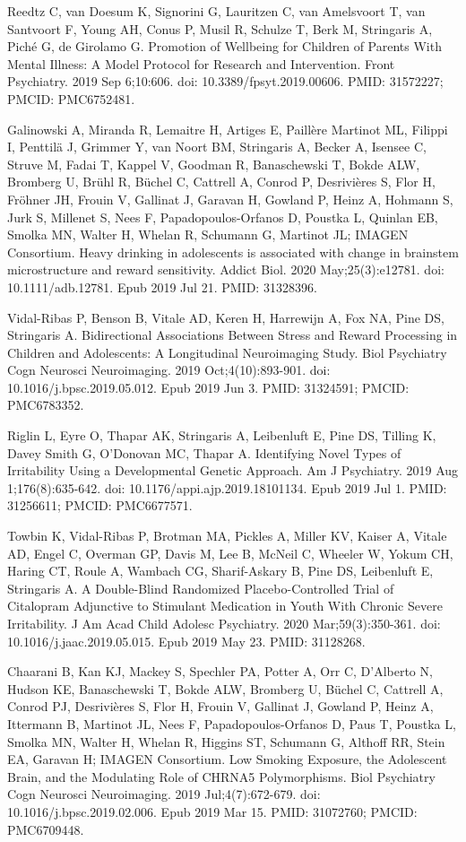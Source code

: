 \documentclass[
]{article}
\begin{document}
Reedtz C, van Doesum K, Signorini G, Lauritzen C, van Amelsvoort T, van
Santvoort F, Young AH, Conus P, Musil R, Schulze T, Berk M, Stringaris
A, Piché G, de Girolamo G. Promotion of Wellbeing for Children of
Parents With Mental Illness: A Model Protocol for Research and
Intervention. Front Psychiatry. 2019 Sep 6;10:606. doi:
10.3389/fpsyt.2019.00606. PMID: 31572227; PMCID: PMC6752481.

Galinowski A, Miranda R, Lemaitre H, Artiges E, Paillère Martinot ML,
Filippi I, Penttilä J, Grimmer Y, van Noort BM, Stringaris A, Becker A,
Isensee C, Struve M, Fadai T, Kappel V, Goodman R, Banaschewski T, Bokde
ALW, Bromberg U, Brühl R, Büchel C, Cattrell A, Conrod P, Desrivières S,
Flor H, Fröhner JH, Frouin V, Gallinat J, Garavan H, Gowland P, Heinz A,
Hohmann S, Jurk S, Millenet S, Nees F, Papadopoulos-Orfanos D, Poustka
L, Quinlan EB, Smolka MN, Walter H, Whelan R, Schumann G, Martinot JL;
IMAGEN Consortium. Heavy drinking in adolescents is associated with
change in brainstem microstructure and reward sensitivity. Addict Biol.
2020 May;25(3):e12781. doi: 10.1111/adb.12781. Epub 2019 Jul 21. PMID:
31328396.

Vidal-Ribas P, Benson B, Vitale AD, Keren H, Harrewijn A, Fox NA, Pine
DS, Stringaris A. Bidirectional Associations Between Stress and Reward
Processing in Children and Adolescents: A Longitudinal Neuroimaging
Study. Biol Psychiatry Cogn Neurosci Neuroimaging. 2019
Oct;4(10):893-901. doi: 10.1016/j.bpsc.2019.05.012. Epub 2019 Jun 3.
PMID: 31324591; PMCID: PMC6783352.

Riglin L, Eyre O, Thapar AK, Stringaris A, Leibenluft E, Pine DS,
Tilling K, Davey Smith G, O'Donovan MC, Thapar A. Identifying Novel
Types of Irritability Using a Developmental Genetic Approach. Am J
Psychiatry. 2019 Aug 1;176(8):635-642. doi:
10.1176/appi.ajp.2019.18101134. Epub 2019 Jul 1. PMID: 31256611; PMCID:
PMC6677571.

Towbin K, Vidal-Ribas P, Brotman MA, Pickles A, Miller KV, Kaiser A,
Vitale AD, Engel C, Overman GP, Davis M, Lee B, McNeil C, Wheeler W,
Yokum CH, Haring CT, Roule A, Wambach CG, Sharif-Askary B, Pine DS,
Leibenluft E, Stringaris A. A Double-Blind Randomized Placebo-Controlled
Trial of Citalopram Adjunctive to Stimulant Medication in Youth With
Chronic Severe Irritability. J Am Acad Child Adolesc Psychiatry. 2020
Mar;59(3):350-361. doi: 10.1016/j.jaac.2019.05.015. Epub 2019 May 23.
PMID: 31128268.

Chaarani B, Kan KJ, Mackey S, Spechler PA, Potter A, Orr C, D'Alberto N,
Hudson KE, Banaschewski T, Bokde ALW, Bromberg U, Büchel C, Cattrell A,
Conrod PJ, Desrivières S, Flor H, Frouin V, Gallinat J, Gowland P, Heinz
A, Ittermann B, Martinot JL, Nees F, Papadopoulos-Orfanos D, Paus T,
Poustka L, Smolka MN, Walter H, Whelan R, Higgins ST, Schumann G,
Althoff RR, Stein EA, Garavan H; IMAGEN Consortium. Low Smoking
Exposure, the Adolescent Brain, and the Modulating Role of CHRNA5
Polymorphisms. Biol Psychiatry Cogn Neurosci Neuroimaging. 2019
Jul;4(7):672-679. doi: 10.1016/j.bpsc.2019.02.006. Epub 2019 Mar 15.
PMID: 31072760; PMCID: PMC6709448.
\end{document}
